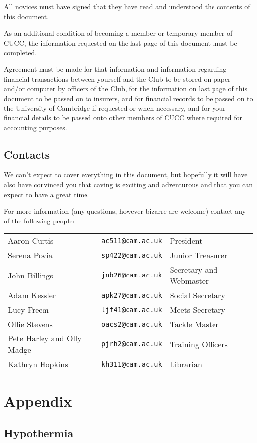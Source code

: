 \documentclass[a4paper,11pt]{article}
\begin{document}
All novices must have signed that they have read and understood the contents of
this document.

As an additional condition of becoming a member or temporary member of CUCC, the
information requested on the last page of this document must be completed.

Agreement must be made for that information and information regarding financial
transactions between yourself and the Club to be stored on paper and/or
computer by officers of the Club, for the information on last page of this
document to be passed on to insurers, and for financial records to be passed on
to the University of Cambridge if requested or when necessary, and for your financial
details to be passed onto other members of CUCC where required for accounting
purposes.

\newpage
\subsection*{Contacts}

We can't expect to cover everything in this document, but hopefully it will
have also have convinced you that caving is exciting and adventurous and that
you can expect to have a great time.

For more information (any questions,
however bizarre are welcome) contact any of the following people:

\begin{tabular}{lll}
Aaron Curtis & {\tt ac511@cam.ac.uk} & President\\
Serena Povia & {\tt sp422@cam.ac.uk} & Junior Treasurer\\
John Billings & {\tt jnb26@cam.ac.uk} & Secretary and Webmaster\\
Adam Kessler & {\tt apk27@cam.ac.uk} & Social Secretary\\
Lucy Freem & {\tt ljf41@cam.ac.uk} & Meets Secretary\\
Ollie Stevens & {\tt oacs2@cam.ac.uk} & Tackle Master\\
Pete Harley and Olly Madge & {\tt pjrh2@cam.ac.uk} & Training Officers\\
Kathryn Hopkins & {\tt kh311@cam.ac.uk} & Librarian
\end{tabular}

\newpage
\section*{Appendix}

\subsection*{Hypothermia}
\end{document}
